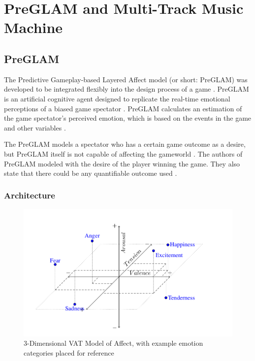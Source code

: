 \section{PreGLAM and Multi-Track Music Machine}

\subsection{PreGLAM}

The Predictive Gameplay-based Layered Affect model (or short: PreGLAM)
was developed to be integrated flexibly into the design process of a 
game \cite{plut2023preglam}. PreGLAM is an artificial cognitive agent
designed to replicate the real-time emotional perceptions of a biased 
game spectator \cite{plut2023preglam}. PreGLAM calculates an estimation
of the game spectator's perceived emotion, which is based on the 
events in the game and other variables \cite{plut2023preglam}.

The PreGLAM models a spectator who has a certain game outcome as
a desire, but PreGLAM itself is not capable of affecting the gameworld
\cite{plut2023preglam}. The authors of PreGLAM modeled with the desire
of the player winning the game. They also state that there could 
be any quantifiable outcome used \cite{plut2023preglam}.

\subsubsection{Architecture}

\begin{figure}[h]
    \centering
    \includegraphics[width=\linewidth]{images/vat_model.png}
    \caption{3-Dimensional VAT Model of Affect, with example emotion categories placed for reference \cite{plut2023preglam}}
    \label{fig:vat_model}
\end{figure}

